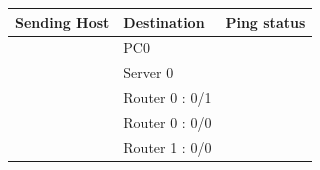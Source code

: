 \documentclass[a4paper,11pt]{article}
\begin{document}
\begin{enumerate}


          \begin{table}[H]
              \centering
              \begin{tabular}{| m{9em}| m{12em}| m{9em} |}
                  \hline
                  {\cellcolor[rgb]{0.333,0.686,1}}\textbf{Sending Host}           & \textbf{Destination} & \textbf{Ping status}                                                                      \\
                  \hline
                  {\cellcolor[rgb]{0.333,0.686,1}}                                & PC0                  & {\cellcolor[rgb]{1,0.173,0.09}}                                                           \\
                  \hhline{|>{\arrayrulecolor[rgb]{0.333,0.686,1}}->{\arrayrulecolor{black}}->{\arrayrulecolor[rgb]{1,0.173,0.09}}->{\arrayrulecolor{black}}|}
                  {\cellcolor[rgb]{0.333,0.686,1}}                                & Server 0             & {\cellcolor[rgb]{1,0.173,0.09}}                                                           \\
                  \hhline{|>{\arrayrulecolor[rgb]{0.333,0.686,1}}->{\arrayrulecolor{black}}->{\arrayrulecolor[rgb]{1,0.173,0.09}}->{\arrayrulecolor{black}}|}
                  {\cellcolor[rgb]{0.333,0.686,1}}                                & Router 0 : 0/1       & {\cellcolor[rgb]{1,0.173,0.09}}                                                           \\
                  \hhline{|>{\arrayrulecolor[rgb]{0.333,0.686,1}}->{\arrayrulecolor{black}}->{\arrayrulecolor[rgb]{1,0.173,0.09}}->{\arrayrulecolor{black}}|}
                  {\cellcolor[rgb]{0.333,0.686,1}}                                & Router 0 : 0/0       & {\cellcolor[rgb]{1,0.173,0.09}}                                                           \\
                  \hhline{|>{\arrayrulecolor[rgb]{0.333,0.686,1}}->{\arrayrulecolor{black}}->{\arrayrulecolor[rgb]{1,0.173,0.09}}->{\arrayrulecolor{black}}|}
                  {\cellcolor[rgb]{0.333,0.686,1}}                                & Router 1 : 0/0       & {\cellcolor[rgb]{1,0.173,0.09}}                                                           \\

\end{tabular}
\end{table}
\end{enumerate}
\end{document}

